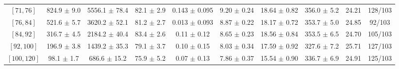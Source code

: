 \begin{tabular}{c||c|c|c|c|c|c|c||c|c}
$[71, 76]$ & 824.9 $\pm$ 9.0 & 5556.1 $\pm$ 78.4 & 82.1 $\pm$ 2.9 & 0.143 $\pm$ 0.095 & 9.20 $\pm$ 0.24 & 18.64 $\pm$ 0.82 & 356.0 $\pm$ 5.2 & 24.21 & 128/103\\
$[76, 84]$ & 521.6 $\pm$ 5.7 & 3620.2 $\pm$ 52.1 & 81.2 $\pm$ 2.7 & 0.013 $\pm$ 0.093 & 8.87 $\pm$ 0.22 & 18.17 $\pm$ 0.72 & 353.7 $\pm$ 5.0 & 24.85 & 92/103\\
$[84, 92]$ & 316.7 $\pm$ 4.5 & 2184.2 $\pm$ 40.4 & 83.4 $\pm$ 2.6 & 0.11 $\pm$ 0.12 & 8.65 $\pm$ 0.23 & 18.56 $\pm$ 0.84 & 353.5 $\pm$ 6.5 & 24.70 & 105/103\\
$[92, 100]$ & 196.9 $\pm$ 3.8 & 1439.2 $\pm$ 35.3 & 79.1 $\pm$ 3.7 & 0.10 $\pm$ 0.15 & 8.03 $\pm$ 0.34 & 17.59 $\pm$ 0.92 & 327.6 $\pm$ 7.2 & 25.71 & 127/103\\
$[100, 120]$ & 98.1 $\pm$ 1.7 & 686.6 $\pm$ 15.2 & 75.9 $\pm$ 5.2 & 0.07 $\pm$ 0.13 & 7.86 $\pm$ 0.37 & 15.54 $\pm$ 0.90 & 336.7 $\pm$ 6.9 & 24.91 & 125/103\\
\end{tabular}
